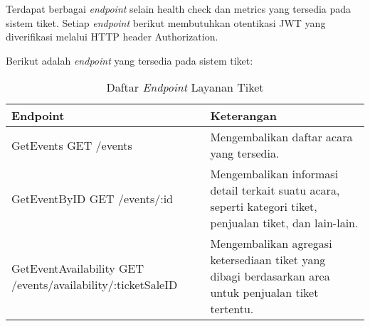 Terdapat berbagai \textit{endpoint} selain health check dan metrics yang tersedia pada sistem tiket. Setiap \textit{endpoint} berikut membutuhkan otentikasi JWT yang diverifikasi melalui HTTP header Authorization.

Berikut adalah \textit{endpoint} yang tersedia pada sistem tiket:

\begin{table}[h!]
      \centering
      \caption{Daftar \textit{Endpoint} Layanan Tiket}
      \begin{tabular}{|p{}|p{}|}
            \hline
            \textbf{Endpoint}                                                    & \textbf{Keterangan}                                                                                                                                                                                                                                                                                                                                                                            \\
            \hline
            GetEvents \newline GET /events                                       & Mengembalikan daftar acara yang tersedia.                                                                                                                                                                                                                                                                                                                                                      \\
            \hline
            GetEventByID \newline GET /events/:id                                & Mengembalikan informasi detail terkait suatu acara, seperti kategori tiket, penjualan tiket, dan lain-lain.                                                                                                                                                                                                                                                                                    \\
            \hline
            GetEventAvailability \newline GET /events/availability/:ticketSaleID & Mengembalikan agregasi ketersediaan tiket yang dibagi berdasarkan area untuk penjualan tiket tertentu.                                                                                                                                                                                                                                                                                         \\

\end{tabular}
\end{table}
